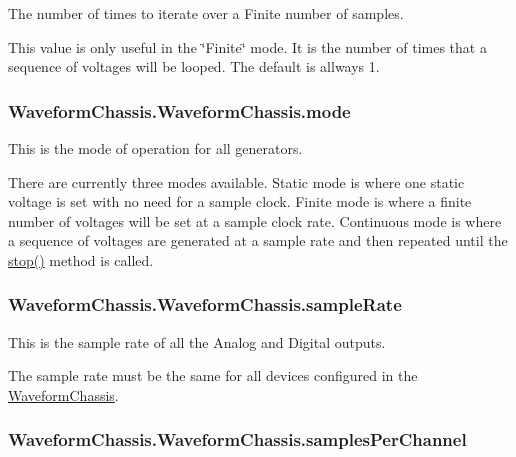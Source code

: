 The number of times to iterate over a Finite number of samples. 

This value is only useful in the \char`\"{}\-Finite\char`\"{} mode. It is the number of times that a sequence of voltages will be looped. The default is allways 1. \hypertarget{class_waveform_chassis_1_1_waveform_chassis_a87be64310be9b7775c6915cbdfa7a2af}{
\subsubsection[{mode}]{\setlength{\rightskip}{0pt plus 5cm}Waveform\-Chassis.\-Waveform\-Chassis.\-mode}}\label{class_waveform_chassis_1_1_waveform_chassis_a87be64310be9b7775c6915cbdfa7a2af}


This is the mode of operation for all generators. 

There are currently three modes available. Static mode is where one static voltage is set with no need for a sample clock. Finite mode is where a finite number of voltages will be set at a sample clock rate. Continuous mode is where a sequence of voltages are generated at a sample rate and then repeated until the \hyperlink{class_waveform_chassis_1_1_waveform_chassis_a96f52784b946d309f98866433d0b2b67}{stop()} method is called. \hypertarget{class_waveform_chassis_1_1_waveform_chassis_ab15b973ee2283c67e5178280245fe585}{
\subsubsection[{sample\-Rate}]{\setlength{\rightskip}{0pt plus 5cm}Waveform\-Chassis.\-Waveform\-Chassis.\-sample\-Rate}}\label{class_waveform_chassis_1_1_waveform_chassis_ab15b973ee2283c67e5178280245fe585}


This is the sample rate of all the Analog and Digital outputs. 

The sample rate must be the same for all devices configured in the \hyperlink{class_waveform_chassis_1_1_waveform_chassis}{Waveform\-Chassis}. \hypertarget{class_waveform_chassis_1_1_waveform_chassis_aec121d179ad4d3bbc2da3a2469dd2dfa}{
\subsubsection[{samples\-Per\-Channel}]{\setlength{\rightskip}{0pt plus 5cm}Waveform\-Chassis.\-Waveform\-Chassis.\-samples\-Per\-Channel}}\label{class_waveform_chassis_1_1_waveform_chassis_aec121d179ad4d3bbc2da3a2469dd2dfa}


